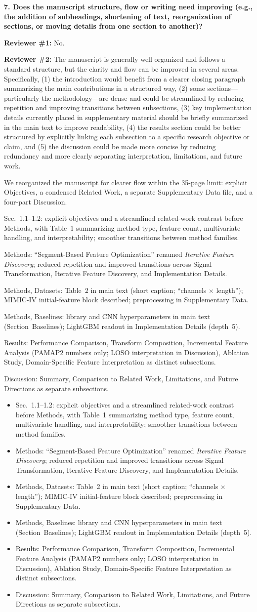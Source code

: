 \documentclass[11pt]{article}
\makeatletter
\newcommand{\rsp}{\par\vspace{0.9em}}
\newcommand{\rcbothq}[3]{%
  \begin{reviewerbox}\textbf{#1}\par\smallskip\textbf{Reviewer \#1:} #2\par\smallskip%
  \textbf{Reviewer \#2:} #3\end{reviewerbox}}
\newcommand{\response}[2]{%
  \begin{responsebox}#1%
  \def\@responseitems{#2}%
  \ifx\@responseitems\empty\else\begin{itemize}[nosep,leftmargin=1.2em]#2\end{itemize}\fi
  \end{responsebox}\rsp}
\makeatother
\begin{document}
\rcbothq{7. Does the manuscript structure, flow or writing need improving (e.g., the addition of
subheadings, shortening of text, reorganization of sections, or moving details from one section
to another)?}{No.}
{The manuscript is generally well organized and follows a standard structure, but the clarity and
flow can be improved in several areas.
Specifically, (1) the introduction would benefit from a clearer closing paragraph summarizing the
main contributions in a structured way, (2) some sections---particularly the
methodology---are dense and could be streamlined by reducing repetition and improving transitions
between subsections, (3) key implementation details currently placed in supplementary material
should be briefly summarized in the main text to improve readability, (4) the results section
could be better structured by explicitly linking each subsection to a specific research objective
or claim, and (5) the discussion could be made more concise by reducing redundancy and more
clearly separating interpretation, limitations, and future work.}

\response{We reorganized the manuscript for clearer flow within the 35-page limit: explicit
Objectives, a condensed Related Work, a separate Supplementary Data file, and a four-part
Discussion.}{
  \item Sec.~1.1--1.2: explicit objectives and a streamlined related-work contrast before Methods,
    with Table~1 summarizing method type, feature count, multivariate handling, and interpretability;
    smoother transitions between method families.
  \item Methods: ``Segment-Based Feature Optimization'' renamed \emph{Iterative Feature Discovery};
    reduced repetition and improved transitions across Signal Transformation, Iterative Feature
    Discovery, and Implementation Details.
  \item Methods, Datasets: Table~2 in main text (short caption; ``channels $\times$ length'');
    MIMIC-IV initial-feature block described; preprocessing in Supplementary Data.
  \item Methods, Baselines: library and CNN hyperparameters in main text (Section~Baselines);
    LightGBM readout in Implementation Details (depth~5).
  \item Results: Performance Comparison, Transform Composition, Incremental Feature Analysis
    (PAMAP2 numbers only; LOSO interpretation in Discussion), Ablation Study, Domain-Specific
    Feature Interpretation as distinct subsections.
  \item Discussion: Summary, Comparison to Related Work, Limitations, and Future Directions as
    separate subsections.
}
\end{document}
